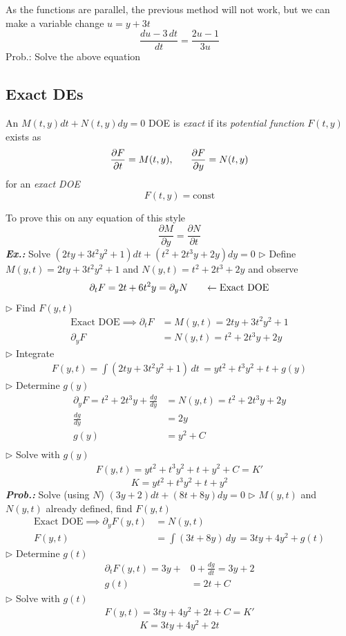 \documentclass[a4paper]{article}
\begin{document}
As the functions are parallel, the previous method will not work, but we can make a variable change $u=y+3t$
$$
\boxed{\frac{du-3\,dt}{dt}=\frac{2u-1}{3u}}
$$
Prob.: Solve the above equation

\subsection{Exact DEs}
An $M(t,y)dt+N(t,y)dy=0$ DOE is \textit{exact} if its \textit{potential function} $F(t,y)$ exists as
$$
\frac{\partial F}{\partial t}=M(t,y),\hspace{4ex} \frac{\partial F}{\partial y}=N(t,y)
$$
for an \textit{exact DOE} 
$$
F(t,y)=\text{const}
$$

To prove this on any equation of this style
$$
\frac{\partial M}{\partial y}=\frac{\partial N}{\partial t}
$$
\textbf{\textit{Ex.: }}Solve $(2ty+3t^{2}y^{2}+1)dt+(t^{2}+2t^{3}y+2y)dy=0$ 
$\triangleright$ Define $M(y,t)=2ty+3t^{2}y^{2}+1$ and $N(y,t)=t^{2}+2t^{3}+2y$ and observe
$$
\partial_{t}F=2t+6t^{2}y=\partial_{y}N\hspace{4ex}\leftarrow\text{Exact DOE}
$$
$\triangleright$ Find $F(y,t)$
\begin{align}
\text{Exact DOE}\implies \partial _{t}F&=M(y,t)=2ty+3t^{2}y^{2}+1 \\
\partial_{y}F&=N(y,t)=t^{2}+2t^{3}y+2y
\end{align}
$\triangleright$ Integrate
\begin{align}
F(y,t)=\int (2ty+3t^{2}y^{2}+1) \, dt\, =yt^{2}+t^{3}y^{2}+t+g(y)
\end{align}
$\triangleright$ Determine $g(y)$
\begin{align}
\partial_{y}F=t^{2}+2t^{3}y+\frac{dg}{dy}&=N(y,t)=t^{2}+2t^{3}y+2y \\
\frac{dg}{dy}&=2y \\
g(y)&=y^{2}+C \\
\end{align}
$\triangleright$ Solve with $g(y)$
\begin{align}
F(y,t)=yt^{2}+t^{3}y^{2}+t+y^{2}+C=K'
\end{align}
$$
\boxed{K=yt^{2}+t^{3}y^{2}+t+y^{2}}
$$
\textbf{\textit{Prob.: }}Solve (using $N$) $(3y+2)dt+(8t+8y)dy=0$
$\triangleright$ $M(y,t)$ and $N(y,t)$ already defined, find $F(y,t)$ 
\begin{align}
\text{Exact DOE}\implies \partial_{y}F(y,t)&=N(y,t) \\
F(y,t)&=\int (3t+8y) \, dy\, =3ty+4y^{2}+g(t)
\end{align}
$\triangleright$ Determine $g(t)$
\begin{align}
\partial_{t}F(y,t)=3y+&0+\frac{dg}{dt}=3y+2 \\
g(t)&=2t+C
\end{align}
$\triangleright$ Solve with $g(t)$ 
\begin{align}
F(y,t)=3ty+4y^{2}+2t+C=K'
\end{align}
$$
\boxed{K=3ty+4y^{2}+2t}
$$
\end{document}

